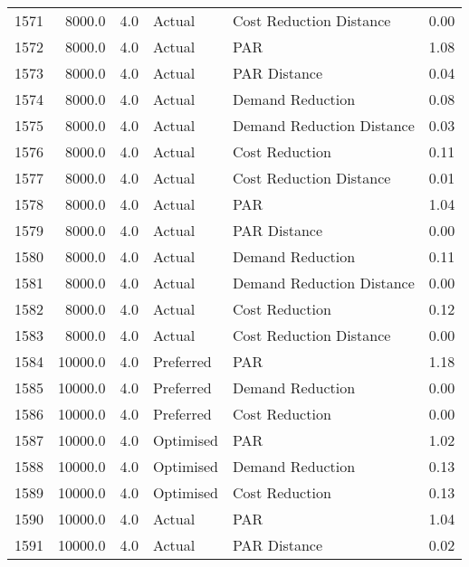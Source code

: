 \begin{longtable}{lrrllr}
1571 &       8000.0 &     4.0 &         Actual &    Cost Reduction Distance &   0.00 \\
1572 &       8000.0 &     4.0 &         Actual &                        PAR &   1.08 \\
1573 &       8000.0 &     4.0 &         Actual &               PAR Distance &   0.04 \\
1574 &       8000.0 &     4.0 &         Actual &           Demand Reduction &   0.08 \\
1575 &       8000.0 &     4.0 &         Actual &  Demand Reduction Distance &   0.03 \\
1576 &       8000.0 &     4.0 &         Actual &             Cost Reduction &   0.11 \\
1577 &       8000.0 &     4.0 &         Actual &    Cost Reduction Distance &   0.01 \\
1578 &       8000.0 &     4.0 &         Actual &                        PAR &   1.04 \\
1579 &       8000.0 &     4.0 &         Actual &               PAR Distance &   0.00 \\
1580 &       8000.0 &     4.0 &         Actual &           Demand Reduction &   0.11 \\
1581 &       8000.0 &     4.0 &         Actual &  Demand Reduction Distance &   0.00 \\
1582 &       8000.0 &     4.0 &         Actual &             Cost Reduction &   0.12 \\
1583 &       8000.0 &     4.0 &         Actual &    Cost Reduction Distance &   0.00 \\
1584 &      10000.0 &     4.0 &      Preferred &                        PAR &   1.18 \\
1585 &      10000.0 &     4.0 &      Preferred &           Demand Reduction &   0.00 \\
1586 &      10000.0 &     4.0 &      Preferred &             Cost Reduction &   0.00 \\
1587 &      10000.0 &     4.0 &      Optimised &                        PAR &   1.02 \\
1588 &      10000.0 &     4.0 &      Optimised &           Demand Reduction &   0.13 \\
1589 &      10000.0 &     4.0 &      Optimised &             Cost Reduction &   0.13 \\
1590 &      10000.0 &     4.0 &         Actual &                        PAR &   1.04 \\
1591 &      10000.0 &     4.0 &         Actual &               PAR Distance &   0.02 \\

\end{longtable}
